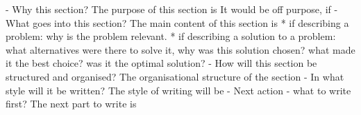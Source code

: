 

% 


- Why this section? 
  The purpose of this section is 
  It would be off purpose, if 
- What goes into this section?
  The main content of this section is 
  * if describing a problem: why is the problem relevant.
  * if describing a solution to a problem: what alternatives were
    there to solve it, why was this solution chosen? 
    what made it the best choice? was it the optimal solution?
- How will this section be structured and organised?
  The organisational structure of the section 
- In what style will it be written?
  The style of writing will be 
- Next action - what to write first?
  The next part to write is


